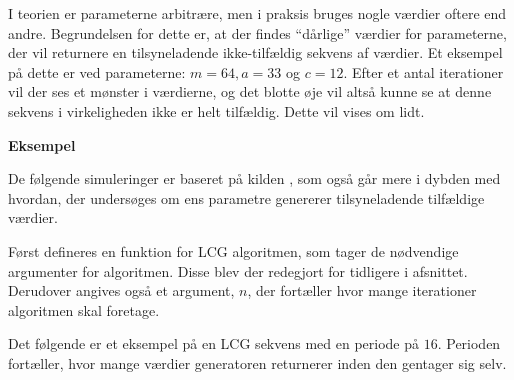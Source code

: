 \documentclass[
]{book}
\newenvironment{Shaded}{\begin{snugshade}}{\end{snugshade}}
\newcommand{\CommentTok}[1]{\textcolor[rgb]{0.56,0.35,0.01}{\textit{#1}}}
\newcommand{\ControlFlowTok}[1]{\textcolor[rgb]{0.13,0.29,0.53}{\textbf{#1}}}
\newcommand{\DecValTok}[1]{\textcolor[rgb]{0.00,0.00,0.81}{#1}}
\newcommand{\KeywordTok}[1]{\textcolor[rgb]{0.13,0.29,0.53}{\textbf{#1}}}
\newcommand{\NormalTok}[1]{#1}
\newcommand{\OperatorTok}[1]{\textcolor[rgb]{0.81,0.36,0.00}{\textbf{#1}}}
\newcommand{\StringTok}[1]{\textcolor[rgb]{0.31,0.60,0.02}{#1}}
\theoremstyle{definition}
\theoremstyle{definition}
\theoremstyle{definition}
\theoremstyle{remark}
\begin{document}
I teorien er parameterne arbitrære, men i praksis bruges nogle værdier oftere end andre. Begrundelsen for dette er, at der findes ``dårlige'' værdier for parameterne, der vil returnere en tilsyneladende ikke-tilfældig sekvens af værdier. Et eksempel på dette er ved parameterne: \(m = 64, a = 33\) og \(c = 12\). Efter et antal iterationer vil der ses et mønster i værdierne, og det blotte øje vil altså kunne se at denne sekvens i virkeligheden ikke er helt tilfældig. Dette vil vises om lidt.

\textbf{Eksempel}

De følgende simuleringer er baseret på kilden \citep{LCGsimu}, som også går mere i dybden med hvordan, der undersøges om ens parametre genererer tilsyneladende tilfældige værdier.

Først defineres en funktion for LCG algoritmen, som tager de nødvendige argumenter for algoritmen. Disse blev der redegjort for tidligere i afsnittet. Derudover angives også et argument, \(n\), der fortæller hvor mange iterationer algoritmen skal foretage.

\begin{Shaded}
\end{Shaded}

Det følgende er et eksempel på en LCG sekvens med en periode på \(16\). Perioden fortæller, hvor mange værdier generatoren returnerer inden den gentager sig selv.
\end{document}
